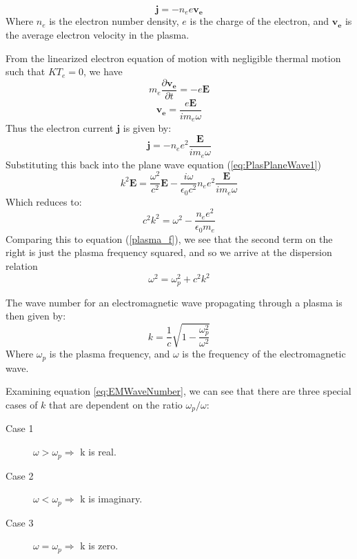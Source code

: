 \documentclass[twocolumn]{article}
\begin{document}
\begin{equation}
	\mathbf{j} = -n_ee\mathbf{v_e}
\end{equation}
Where $n_e$ is the electron number density, $e$ is the charge of the electron, and $\mathbf{v_e}$ is the average electron velocity in the plasma.

From the linearized electron equation of motion with negligible thermal motion such that $KT_e = 0$, we have
\begin{equation}
	m_e\frac{\partial \mathbf{v_e}}{\partial t} = -e\mathbf{E}
\end{equation}
\begin{equation}
	\mathbf{v_e} = \frac{e\mathbf{E}}{im_e\omega}
\end{equation}
Thus the electron current $\mathbf{j}$ is given by:
\begin{equation}
	\mathbf{j} = -n_ee^2\frac{\mathbf{E}}{im_e\omega}
\end{equation}
Substituting this back into the plane wave equation (\ref{eq:PlasPlaneWave1})
\begin{equation}
	k^2\mathbf{E} = \frac{\omega^2}{c^2}\mathbf{E} - \frac{i\omega}{\epsilon_0 c^2}n_ee^2\frac{\mathbf{E}}{im_e\omega}
\end{equation}
Which reduces to:
\begin{equation*}
	c^2k^2 = \omega^2 - \frac{n_ee^2}{\epsilon_0m_e}
\end{equation*}
Comparing this to equation (\ref{plasma_f}), we see that the second term on the right is just the plasma frequency squared, and so we arrive at the dispersion relation
\begin{equation}
	\omega^2 = \omega^2_p + c^2k^2
\end{equation}

The wave number for an electromagnetic wave propagating through a plasma is then given by:
\begin{equation}
	\label{eq:EMWaveNumber}
	k = \frac{1}{c}\sqrt{1-\frac{\omega^2_p}{\omega^2}}	
\end{equation}
Where $\omega_p$ is the plasma frequency, and $\omega$ is the frequency of the electromagnetic wave.

Examining equation \ref{eq:EMWaveNumber}, we can see that there are three special cases of $k$ that are dependent on the ratio $\omega_p/\omega$:
\begin{description}
	\item [Case 1]$\omega > \omega_p \Rightarrow$ k is real.
	\item [Case 2]$\omega < \omega_p \Rightarrow$ k is imaginary.
	\item [Case 3]$\omega = \omega_p \Rightarrow$ k is zero.
\end{description}
\end{document}
